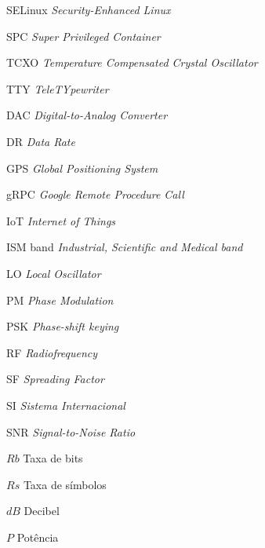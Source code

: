 \documentclass[
  12pt,				%
  openright,			%
  twoside,			%
  a4paper,			%
  english,			%
  french,				%
  spanish,			%
  brazil,				%
  ]{abntex2}
\begin{document}
\begin{siglas}
  \item[SELinux]    \textit{Security-Enhanced Linux}
  \item[SPC]        \textit{Super Privileged Container}
  \item[TCXO]       \textit{Temperature Compensated Crystal Oscillator}
  \item[TTY]        \textit{TeleTYpewriter}
  \item[DAC]        \textit{Digital-to-Analog Converter}
  \item[DR]         \textit{Data Rate}
  \item[GPS]        \textit{Global Positioning System}
  \item[gRPC]       \textit{Google Remote Procedure Call}
  \item[IoT]        \textit{Internet of Things}
  \item[ISM band]   \textit{Industrial, Scientific and Medical band}
  \item[LO]         \textit{Local Oscillator}
  \item[PM]         \textit{Phase Modulation}
  \item[PSK]        \textit{Phase-shift keying}
  \item[RF]         \textit{Radiofrequency}
  \item[SF]         \textit{Spreading Factor}
  \item[SI]         \textit{Sistema Internacional}
  \item[SNR]        \textit{Signal-to-Noise Ratio}

\end{siglas}

\begin{simbolos}
  \item[$ Rb $] Taxa de bits
  \item[$ Rs $] Taxa de símbolos
  \item[$ dB $] Decibel
  \item[$ P $] Potência
\end{simbolos}

\tableofcontents*
\cleardoublepage


\textual

\end{document}
